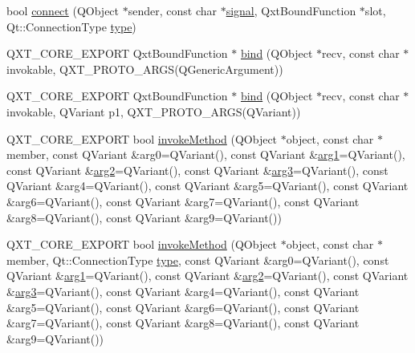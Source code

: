 \begin{DoxyCompactItemize}
\item 
bool \hyperlink{namespace_qxt_meta_object_a0672fb5917d321762dfd192f229469d5}{connect} (Q\-Object $\ast$sender, const char $\ast$\hyperlink{qxtdaemon_8h_aa2d2a7a3fc548ea76dcbc5e441b51260}{signal}, Qxt\-Bound\-Function $\ast$slot, Qt\-::\-Connection\-Type \hyperlink{glext_8h_a7d05960f4f1c1b11f3177dc963a45d86}{type})
\item 
Q\-X\-T\-\_\-\-C\-O\-R\-E\-\_\-\-E\-X\-P\-O\-R\-T Qxt\-Bound\-Function $\ast$ \hyperlink{namespace_qxt_meta_object_ac09d0c585af419f4b65cd841c7f56ea3}{bind} (Q\-Object $\ast$recv, const char $\ast$invokable, Q\-X\-T\-\_\-\-P\-R\-O\-T\-O\-\_\-A\-R\-G\-S(Q\-Generic\-Argument))
\item 
Q\-X\-T\-\_\-\-C\-O\-R\-E\-\_\-\-E\-X\-P\-O\-R\-T Qxt\-Bound\-Function $\ast$ \hyperlink{namespace_qxt_meta_object_a3416aa39930e8f576a1caa8a9a892195}{bind} (Q\-Object $\ast$recv, const char $\ast$invokable, Q\-Variant p1, Q\-X\-T\-\_\-\-P\-R\-O\-T\-O\-\_\-A\-R\-G\-S(Q\-Variant))
\item 
Q\-X\-T\-\_\-\-C\-O\-R\-E\-\_\-\-E\-X\-P\-O\-R\-T bool \hyperlink{namespace_qxt_meta_object_a0fa9f9283ccf787fec0377e96b7e5ae8}{invoke\-Method} (Q\-Object $\ast$object, const char $\ast$member, const Q\-Variant \&arg0=Q\-Variant(), const Q\-Variant \&\hyperlink{glext_8h_a4b247ab422408c1761a36f9034c2585b}{arg1}=Q\-Variant(), const Q\-Variant \&\hyperlink{glext_8h_a5aee5a44bf92a9837fea48e41ef0df57}{arg2}=Q\-Variant(), const Q\-Variant \&\hyperlink{glext_8h_a525a52cc20e1aa70741e5c7dae172f25}{arg3}=Q\-Variant(), const Q\-Variant \&arg4=Q\-Variant(), const Q\-Variant \&arg5=Q\-Variant(), const Q\-Variant \&arg6=Q\-Variant(), const Q\-Variant \&arg7=Q\-Variant(), const Q\-Variant \&arg8=Q\-Variant(), const Q\-Variant \&arg9=Q\-Variant())
\item 
Q\-X\-T\-\_\-\-C\-O\-R\-E\-\_\-\-E\-X\-P\-O\-R\-T bool \hyperlink{namespace_qxt_meta_object_ae6a5f3cc98ada0aa647a1a340ca94d5f}{invoke\-Method} (Q\-Object $\ast$object, const char $\ast$member, Qt\-::\-Connection\-Type \hyperlink{glext_8h_a7d05960f4f1c1b11f3177dc963a45d86}{type}, const Q\-Variant \&arg0=Q\-Variant(), const Q\-Variant \&\hyperlink{glext_8h_a4b247ab422408c1761a36f9034c2585b}{arg1}=Q\-Variant(), const Q\-Variant \&\hyperlink{glext_8h_a5aee5a44bf92a9837fea48e41ef0df57}{arg2}=Q\-Variant(), const Q\-Variant \&\hyperlink{glext_8h_a525a52cc20e1aa70741e5c7dae172f25}{arg3}=Q\-Variant(), const Q\-Variant \&arg4=Q\-Variant(), const Q\-Variant \&arg5=Q\-Variant(), const Q\-Variant \&arg6=Q\-Variant(), const Q\-Variant \&arg7=Q\-Variant(), const Q\-Variant \&arg8=Q\-Variant(), const Q\-Variant \&arg9=Q\-Variant())
\end{DoxyCompactItemize}


